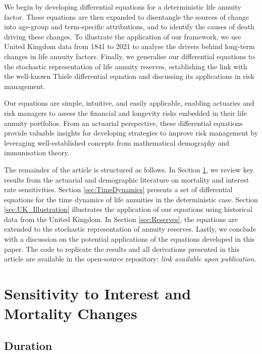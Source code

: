 \documentclass[12pt]{article}
\begin{document}
We begin by developing differential equations for a deterministic life annuity factor. These equations are then expanded to disentangle the sources of change into age-group and term-specific attributions, and to identify the causes of death driving these changes. To illustrate the application of our framework, we use United Kingdom data from 1841 to 2021 to analyse the drivers behind long-term changes in life annuity factors. Finally, we generalise our differential equations to the stochastic representation of life annuity reserves, establishing the link with the well-known Thiele differential equation and discussing its applications in risk management.

Our equations are simple, intuitive, and easily applicable, enabling actuaries and risk managers to assess the financial and longevity risks embedded in their life annuity portfolios. From an actuarial perspective, these differential equations provide valuable insights for developing strategies to improve risk management by leveraging well-established concepts from mathematical demography and immunisation theory.

The remainder of the article is structured as follows. In Section \ref{sec:SensitivityMortalityInterest}, we review key results from the actuarial and demographic literature on mortality and interest rate sensitivities. Section \ref{sec:TimeDynamics} presents a set of differential equations for the time dynamics of life annuities in the deterministic case. Section \ref{sec:UK_Illustration} illustrates the application of our equations using historical data from the United Kingdom.  In Section \ref{sec:Reserves}, the equations are extended to the stochastic representation of annuity reserves. Lastly, we conclude with a discussion on the potential applications of the equations developed in this paper. The code to replicate the results and all derivations presented in this article are available in the open-source repository: \textit{link available upon publication}.



\section{Sensitivity to Interest and Mortality Changes}\label{sec:SensitivityMortalityInterest}

\subsection{Duration}
\end{document}
